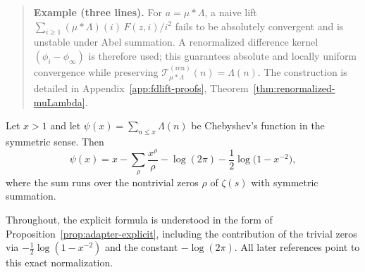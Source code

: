 \begin{quote}\small
\textbf{Example (three lines).}
For $a=\mu*\Lambda$, a naive lift $\sum_{i\ge1}(\mu*\Lambda)(i)\,F(z,i)/i^2$ fails to be absolutely convergent and is unstable under Abel summation.
A renormalized difference kernel $(\phi_i-\phi_\infty)$ is therefore used; this guarantees absolute and locally uniform convergence while preserving $\mathcal T^{(\mathrm{ren})}_{\mu*\Lambda}(n)=\Lambda(n)$.
The construction is detailed in Appendix~\ref{app:fdlift-proofs}, Theorem~\ref{thm:renormalized-muLambda}.
\end{quote}

\begin{proposition}\label{prop:adapter-explicit}
Let $x>1$ and let $\psi(x)=\sum_{n\le x}\Lambda(n)$ be Chebyshev's function in the symmetric sense. Then
\[
\psi(x)= x - \sum_{\rho}\frac{x^{\rho}}{\rho} - \log(2\pi) - \frac{1}{2}\log\!\bigl(1-x^{-2}\bigr),
\]
where the sum runs over the nontrivial zeros $\rho$ of $\zeta(s)$ with symmetric summation.
\end{proposition}

\begin{remark}
Throughout, the explicit formula is understood in the form of Proposition~\ref{prop:adapter-explicit}, including the contribution of the trivial zeros via $-\tfrac12\log(1-x^{-2})$ and the constant $-\log(2\pi)$. All later references point to this exact normalization.
\end{remark}

